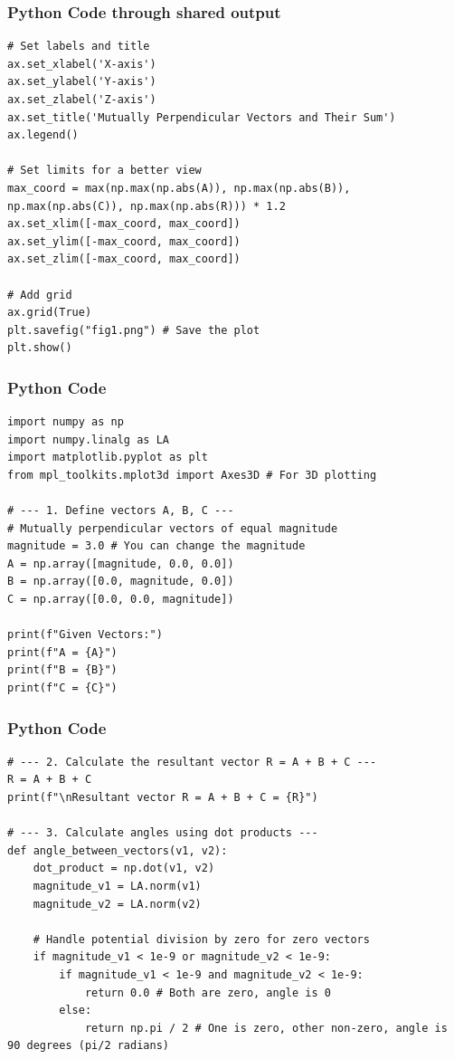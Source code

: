 \documentclass{beamer}
\begin{document}
\begin{frame}[fragile]
\frametitle{Python Code through shared output}
\begin{lstlisting}
# Set labels and title
ax.set_xlabel('X-axis')
ax.set_ylabel('Y-axis')
ax.set_zlabel('Z-axis')
ax.set_title('Mutually Perpendicular Vectors and Their Sum')
ax.legend()

# Set limits for a better view
max_coord = max(np.max(np.abs(A)), np.max(np.abs(B)), np.max(np.abs(C)), np.max(np.abs(R))) * 1.2
ax.set_xlim([-max_coord, max_coord])
ax.set_ylim([-max_coord, max_coord])
ax.set_zlim([-max_coord, max_coord])

# Add grid
ax.grid(True)
plt.savefig("fig1.png") # Save the plot
plt.show()
\end{lstlisting}
\end{frame}

\begin{frame}[fragile]
\frametitle{Python Code}
\begin{lstlisting}
import numpy as np
import numpy.linalg as LA
import matplotlib.pyplot as plt
from mpl_toolkits.mplot3d import Axes3D # For 3D plotting

# --- 1. Define vectors A, B, C ---
# Mutually perpendicular vectors of equal magnitude
magnitude = 3.0 # You can change the magnitude
A = np.array([magnitude, 0.0, 0.0])
B = np.array([0.0, magnitude, 0.0])
C = np.array([0.0, 0.0, magnitude])

print(f"Given Vectors:")
print(f"A = {A}")
print(f"B = {B}")
print(f"C = {C}")
\end{lstlisting}
\end{frame}

\begin{frame}[fragile]
\frametitle{Python Code}
\begin{lstlisting}
# --- 2. Calculate the resultant vector R = A + B + C ---
R = A + B + C
print(f"\nResultant vector R = A + B + C = {R}")

# --- 3. Calculate angles using dot products ---
def angle_between_vectors(v1, v2):
    dot_product = np.dot(v1, v2)
    magnitude_v1 = LA.norm(v1)
    magnitude_v2 = LA.norm(v2)

    # Handle potential division by zero for zero vectors
    if magnitude_v1 < 1e-9 or magnitude_v2 < 1e-9:
        if magnitude_v1 < 1e-9 and magnitude_v2 < 1e-9:
            return 0.0 # Both are zero, angle is 0
        else:
            return np.pi / 2 # One is zero, other non-zero, angle is 90 degrees (pi/2 radians)
\end{lstlisting}
\end{frame}
\end{document}
